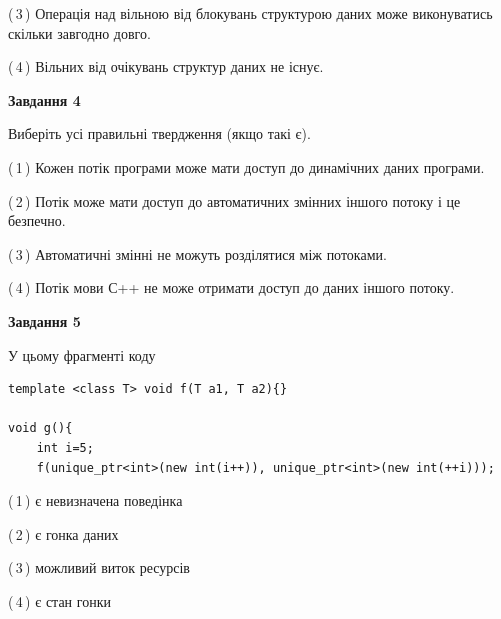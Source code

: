 \documentclass[12pt, ukrainian]{article}
\begin{document}
\begin {large}
{(\,3\,) Операція над вільною від блокувань структурою даних може виконуватись скільки завгодно довго.%

(\,4\,) Вільних від очікувань структур даних не існує.%



\begin{center}
\textbf{Завдання 4}
\end{center}
Виберіть усі правильні твердження (якщо такі є).\par
\vspace{2mm}

(\,1\,) Кожен потік програми може мати доступ до динамічних даних програми.%

(\,2\,) Потік може мати доступ до автоматичних змінних іншого потоку і це безпечно.%

(\,3\,) Автоматичні змінні не можуть розділятися між потоками.%

(\,4\,) Потік мови С++ не може отримати доступ до даних іншого потоку.%



\begin{center}
\textbf{Завдання 5}
\end{center}
У цьому фрагменті коду
\begin{verbatim}
template <class T> void f(T a1, T a2){}

void g(){
    int i=5;
    f(unique_ptr<int>(new int(i++)), unique_ptr<int>(new int(++i)));
\end{verbatim}

(\,1\,) є невизначена поведінка%

(\,2\,) є гонка даних%

(\,3\,) можливий виток ресурсів%

(\,4\,) є стан гонки%


}
\end {large}
\end{document}
